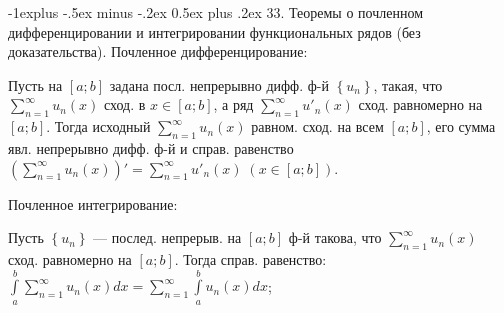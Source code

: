 \documentclass[unicode,10pt, landscape]{article}
\makeatletter
\renewcommand{\subsection}{\@startsection{subsection}{2}{0mm}%
                                {-1explus -.5ex minus -.2ex}%
                                {0.5ex plus .2ex}%
                                {\normalfont\normalsize\bfseries}}
\makeatother
\begin{document}
\begin{multicols}{4}

\subsection{33. Теоремы о почленном дифференцировании и интегрировании функциональных рядов (без доказательства).}
Почленное дифференцирование:
\begin{Th}
Пусть на $\left[a;b\right]$ задана посл. непрерывно дифф. ф-й $\left \{ u_{n} \right \}$, такая, что $\sum_{n=1}^{\infty }u_{n}(x)$ сход. в $x\in \left[a;b\right]$, а ряд $\sum_{n=1}^{\infty }u'_{n}(x)$ сход.  равномерно на $\left[a;b\right]$. Тогда исходный $\sum_{n=1}^{\infty }u_{n}(x)$ равном. сход. на всем $\left[a;b\right]$, его сумма явл. непрерывно дифф. ф-й и справ. равенство $\left ( \sum_{n=1}^{\infty }u_{n}(x) \right )'=\sum_{n=1}^{\infty }u'_{n}(x)\; (x\in \left[a;b\right])$.
\end{Th}
Почленное интегрирование:
\begin{Th}
Пусть $\left \{ u_{n} \right \}$ — послед. непрерыв. на $\left[a;b\right]$ ф-й такова, что $\sum_{n=1}^{\infty }u_{n}(x)$ сход. равномерно на $\left[a;b\right]$. Тогда справ. равенство: $\int\limits_{a}^{b}\sum_{n=1}^{\infty }u_{n}(x)dx=\sum_{n=1}^{\infty }\int\limits_{a}^{b}u_{n}(x)dx$;
\end{Th}



\end{multicols}
\end{document}
